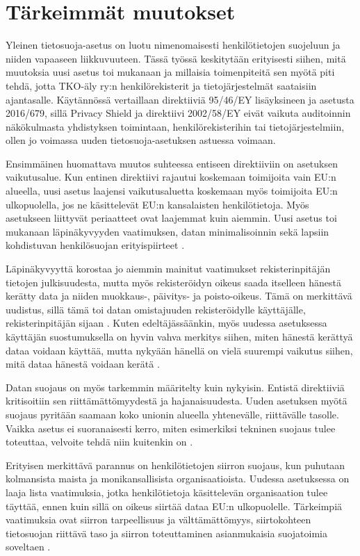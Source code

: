 \documentclass[finnish]{tktltiki}
\begin{document}
\newpage
\section{Tärkeimmät muutokset}

Yleinen tietosuoja-asetus on luotu nimenomaisesti henkilötietojen suojeluun ja niiden vapaaseen liikkuvuuteen. Tässä työssä keskitytään erityisesti siihen, mitä muutoksia uusi asetus toi mukanaan ja millaisia toimenpiteitä sen myötä piti tehdä, jotta TKO-äly ry:n henkilörekisterit ja tietojärjestelmät saataisiin ajantasalle. Käytännössä vertaillaan direktiiviä 95/46/EY lisäyksineen ja asetusta 2016/679, sillä Privacy Shield ja direktiivi 2002/58/EY eivät vaikuta auditoinnin näkökulmasta yhdistyksen toimintaan, henkilörekisterihin tai tietojärjestelmiin, ollen jo voimassa uuden tietosuoja-asetuksen astuessa voimaan. 

Ensimmäinen huomattava muutos suhteessa entiseen direktiiviin on asetuksen vaikutusalue. Kun entinen direktiivi rajautui koskemaan toimijoita vain EU:n alueella, uusi asetus laajensi vaikutusaluetta koskemaan myös toimijoita EU:n ulkopuolella, jos ne käsittelevät EU:n kansalaisten henkilötietoja. Myös asetukseen liittyvät periaatteet ovat laajemmat kuin aiemmin. Uusi asetus toi mukanaan läpinäkyvyyden vaatimuksen, datan minimalisoinnin sekä lapsiin kohdistuvan henkilösuojan erityispiirteet \cite{eu2016,tikkinen}.

Läpinäkyvyyttä korostaa jo aiemmin mainitut vaatimukset rekisterinpitäjän tietojen julkisuudesta, mutta myös rekisteröidyn oikeus saada itselleen hänestä kerätty data ja niiden muokkaus-, päivitys- ja poisto-oikeus. Tämä on merkittävä uudistus, sillä tämä toi datan omistajuuden rekisteröidylle käyttäjälle, rekisterinpitäjän sijaan \cite{eu2016}. Kuten edeltäjässäänkin, myös uudessa asetuksessa käyttäjän suostumuksella on hyvin vahva merkitys siihen, miten hänestä kerättyä dataa voidaan käyttää, mutta nykyään hänellä on vielä suurempi vaikutus siihen, mitä dataa hänestä voidaan kerätä \cite{eu2016,rikke}.

Datan suojaus on myös tarkemmin määritelty kuin nykyisin. Entistä direktiiviä kritisoitiin sen riittämättömyydestä ja hajanaisuudesta. Uuden asetuksen myötä suojaus pyritään saamaan koko unionin alueella yhtenevälle, riittävälle tasolle. Vaikka asetus ei suoranaisesti kerro, miten esimerkiksi tekninen suojaus tulee toteuttaa, velvoite tehdä niin kuitenkin on \cite{eu2016,barb,tikkinen}. 

Erityisen merkittävä parannus on henkilötietojen siirron suojaus, kun puhutaan kolmansista maista ja monikansallisista organisaatioista. Uudessa asetuksessa on laaja lista vaatimuksia, jotka henkilötietoja käsittelevän organisaation tulee täyttää, ennen kuin sillä on oikeus siirtää dataa EU:n ulkopuolelle. Tärkeimpiä vaatimuksia ovat siirron tarpeellisuus ja välttämättömyys, siirtokohteen tietosuojan riittävä taso ja siirron toteuttaminen asianmukaisia suojatoimia soveltaen \cite{eu2016}. 
\end{document}
